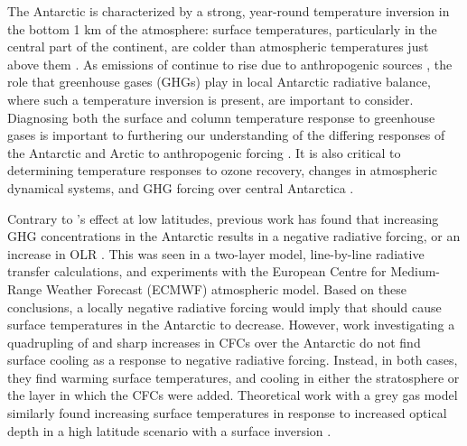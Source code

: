 \documentclass[draft]{agujournal2019}
\begin{document}
The Antarctic is characterized by a strong, year-round temperature inversion in the bottom 1 km of the atmosphere: surface temperatures, particularly in the central part of the continent, are colder than atmospheric temperatures just above them \cite{hudson_look_2005}. As emissions of  continue to rise due to anthropogenic sources \cite{peters_carbon_2020}, the role that greenhouse gases (GHGs) play in local Antarctic radiative balance, where such a temperature inversion is present, are important to consider. Diagnosing both the surface and column temperature response to greenhouse gases is important to furthering our understanding of the differing responses of the Antarctic and Arctic to anthropogenic forcing \cite{manabe_sensitivity_1980}. It is also critical to determining temperature responses to ozone recovery, changes in atmospheric dynamical systems, and GHG forcing over central Antarctica \cite{shindell_southern_2004, thompson_signatures_2011}.

Contrary to 's effect at low latitudes, previous work has found that increasing GHG concentrations in the Antarctic results in a negative radiative forcing, or an increase in OLR \cite{schmithusen_how_2015,huang_inhomogeneous_2016}. This was seen in a two-layer model, line-by-line radiative transfer calculations, and experiments with the European Centre for Medium-Range Weather Forecast (ECMWF) atmospheric model. Based on these conclusions, a locally negative radiative forcing would imply that  should cause surface temperatures in the Antarctic to decrease. However, work investigating a quadrupling of  \cite{smith_no_2018} and sharp increases in CFCs over the Antarctic \cite{flanner_climate_2018} do not find surface cooling as a response to negative radiative forcing. Instead, in both cases, they find warming surface temperatures, and cooling in either the stratosphere or the layer in which the CFCs were added. Theoretical work with a grey gas model similarly found increasing surface temperatures in response to increased optical depth in a high latitude scenario with a surface inversion \cite{payne_conceptual_2015}.
\end{document}
